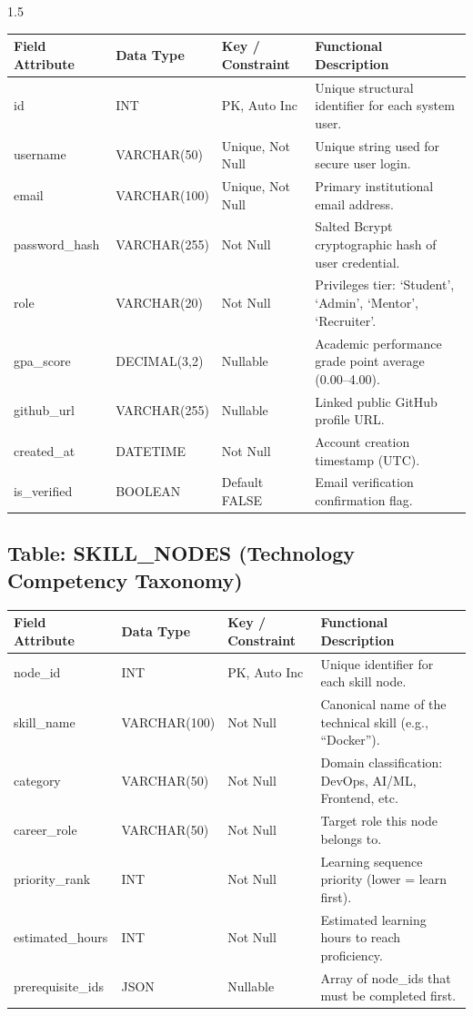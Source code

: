\documentclass[12pt,a4paper]{report}
\begin{document}
\begin{spacing}{1.5}
		\begin{tabular}{|p{3.5cm}|p{3.2cm}|p{2.5cm}|p{5.8cm}|}
			\hline
			\rowcolor{mainblue!10}\textbf{Field Attribute} & \textbf{Data Type} & \textbf{Key / Constraint} & \textbf{Functional Description} \\ \hline
			id & INT & PK, Auto Inc & Unique structural identifier for each system user. \\ \hline
			username & VARCHAR(50) & Unique, Not Null & Unique string used for secure user login. \\ \hline
			email & VARCHAR(100) & Unique, Not Null & Primary institutional email address. \\ \hline
			password\_hash & VARCHAR(255) & Not Null & Salted Bcrypt cryptographic hash of user credential. \\ \hline
			role & VARCHAR(20) & Not Null & Privileges tier: `Student', `Admin', `Mentor', `Recruiter'. \\ \hline
			gpa\_score & DECIMAL(3,2) & Nullable & Academic performance grade point average (0.00--4.00). \\ \hline
			github\_url & VARCHAR(255) & Nullable & Linked public GitHub profile URL. \\ \hline
			created\_at & DATETIME & Not Null & Account creation timestamp (UTC). \\ \hline
			is\_verified & BOOLEAN & Default FALSE & Email verification confirmation flag. \\ \hline
		\end{tabular}
		
		\subsection{Table: SKILL\_NODES (Technology Competency Taxonomy)}
		
		\begin{tabular}{|p{3.5cm}|p{3.2cm}|p{2.5cm}|p{5.8cm}|}
			\hline
			\rowcolor{mainblue!10}\textbf{Field Attribute} & \textbf{Data Type} & \textbf{Key / Constraint} & \textbf{Functional Description} \\ \hline
			node\_id & INT & PK, Auto Inc & Unique identifier for each skill node. \\ \hline
			skill\_name & VARCHAR(100) & Not Null & Canonical name of the technical skill (e.g., ``Docker''). \\ \hline
			category & VARCHAR(50) & Not Null & Domain classification: DevOps, AI/ML, Frontend, etc. \\ \hline
			career\_role & VARCHAR(50) & Not Null & Target role this node belongs to. \\ \hline
			priority\_rank & INT & Not Null & Learning sequence priority (lower = learn first). \\ \hline
			estimated\_hours & INT & Not Null & Estimated learning hours to reach proficiency. \\ \hline
			prerequisite\_ids & JSON & Nullable & Array of node\_ids that must be completed first. \\ \hline
		\end{tabular}
		

\end{spacing}
\end{document}
